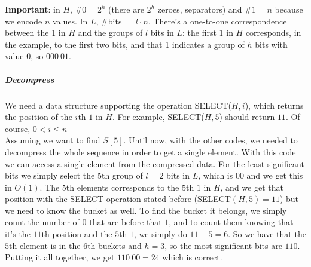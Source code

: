 \documentclass[10pt]{report}
\begin{document}
\textbf{Important}: in $H$, $\#0 = 2^h$ (there are $2^h$ zeroes, separators) and $\#1 = n$ because we encode $n$ values. In $L$, \#bits $= l\cdot n$. There's a one-to-one correspondence between the 1 in $H$ and the groups of $l$ bits in $L$: the first $1$ in $H$ corresponds, in the example, to the first two bits, and that 1 indicates a group of $h$ bits with value 0, so $000\:01$.
\subparagraph{Decompress}
We need a data structure supporting the operation SELECT($H, i$), which returns the position of the $i$th $1$ in $H$. For example, SELECT($H, 5$) should return $11$. Of course, $0< i \leq n$\\
Assuming we want to find $S[5]$. Until now, with the other codes, we needed to decompress the whole sequence in order to get a single element. With this code we can access a single element from the compressed data. For the least significant bits we simply select the $5$th group of $l=2$ bits in $L$, which is $00$ and we get this in $O(1)$. The $5$th elements corresponds to the $5$th $1$ in $H$, and we get that position with the SELECT operation stated before (SELECT$(H,5)= 11$) but we need to know the bucket as well. To find the bucket it belongs, we simply count the number of $0$ that are before that $1$, and to count them knowing that it's the $11$th position and the $5$th $1$, we simply do $11-5=6$. So we have that the $5$th element is in the $6$th buckets and $h=3$, so the most significant bits are $110$. Putting it all together, we get $110\:00 = 24$ which is correct.
\end{document}
